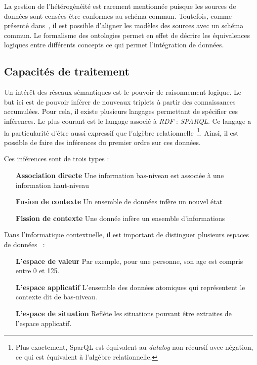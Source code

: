 La gestion de l'hétérogénéité est rarement mentionnée puisque les sources de données sont censées être conformes au schéma commun. Toutefois, comme présenté dans~\cite{Kaed:these}, il est possible d'aligner les modèles des sources avec un schéma commun. Le formalisme des ontologies permet en effet de décrire les équivalences logiques entre différents concepts ce qui permet l'intégration de données.

\subsection{Capacités de traitement}
Un intérêt des réseaux sémantiques est le pouvoir de raisonnement logique. Le but ici est de pouvoir inférer de nouveaux triplets à partir des connaissances accumulées. Pour cela, il existe plusieurs langages permettant de spécifier ces inférences. Le plus courant est le langage associé à \textit{RDF} : \textit{SPARQL}. Ce langage a la particularité d'être aussi expressif que l'algèbre relationnelle~\cite{Angles:sparql}\footnote{Plus exactement, SparQL est équivalent au \textit{datalog} non récursif avec négation, ce qui est équivalent à l'algèbre relationnelle.}. Ainsi, il est possible de faire des inférences du premier ordre sur ces données.

Ces inférences sont de trois types :
\begin{itemize}
 \item[\textbf{Association directe}] Une information bas-niveau est associée à une information haut-niveau 
 \item[\textbf{Fusion de contexte}] Un ensemble de données infère un nouvel état 
 \item[\textbf{Fission de contexte}] Une donnée infère un ensemble d'informations
\end{itemize}

Dans l'informatique contextuelle, il est important de distinguer plusieurs espaces de données~\cite{Padovitz:agent} :
\begin{itemize}
 \item[\textbf{L'espace de valeur}] Par exemple, pour une personne, son age est compris entre 0 et 125.
 \item[\textbf{L'espace applicatif}] L'ensemble des données atomiques qui représentent le contexte dit de bas-niveau.
 \item[\textbf{L'espace de situation}] Reflète les situations pouvant être extraites de l'espace applicatif.
\end{itemize}

